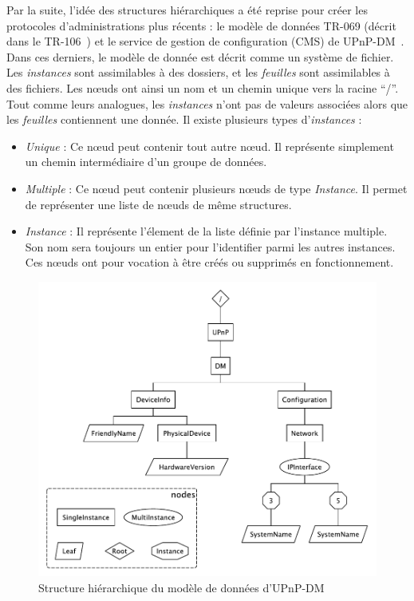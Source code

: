 Par la suite, l'idée des structures hiérarchiques a été reprise pour créer les protocoles d'administrations plus récents : le modèle de données TR-069 (décrit dans le TR-106~\cite{BBF:tr106}) et le service de gestion de configuration (CMS) de UPnP-DM~\cite{UPnP:DMCMS}. Dans ces derniers, le modèle de donnée est décrit comme un système de fichier. Les \textit{instances} sont assimilables à des dossiers, et les \textit{feuilles} sont assimilables à des fichiers. Les nœuds ont ainsi un nom et un chemin unique vers la racine \enquote{/}. Tout comme leurs analogues, les \textit{instances} n'ont pas de valeurs associées alors que les \textit{feuilles} contiennent une donnée. Il existe plusieurs types d'\textit{instances} :
\begin{itemize}
    \item \textit{Unique} : Ce nœud peut contenir tout autre nœud. Il représente simplement un chemin intermédiaire d'un groupe de données.
    \item \textit{Multiple} : Ce nœud peut contenir plusieurs nœuds de type \textit{Instance}. Il permet de représenter une liste de nœuds de même structures.
    \item \textit{Instance} : Il représente l'élement de la liste définie par l'instance multiple. Son nom sera toujours un entier pour l'identifier parmi les autres instances. Ces nœuds ont pour vocation à être créés ou supprimés en fonctionnement.
\end{itemize}
\begin{figure}[ht]
    \centering
    \includegraphics[width=.75\textwidth]{fig/rw-supervision-dmtree}
    \caption{Structure hiérarchique du modèle de données d'UPnP-DM}\label{fig:rw:supervision:dmtree}
\end{figure}


